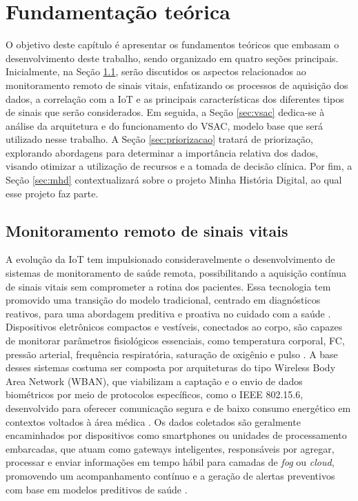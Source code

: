 \documentclass[twoside,english,brazilian]{UNISINOSmonografia}
\begin{document}
\chapter{Fundamentação teórica}

O objetivo deste capítulo é apresentar os fundamentos teóricos que embasam o desenvolvimento deste trabalho, sendo organizado em quatro seções principais. Inicialmente, na Seção \ref{sec:monit}, serão discutidos os aspectos relacionados ao monitoramento remoto de sinais vitais, enfatizando os processos de aquisição dos dados, a correlação com a IoT e as principais características dos diferentes tipos de sinais que serão considerados. Em seguida, a Seção \ref{sec:vsac} dedica-se à análise da arquitetura e do funcionamento do VSAC, modelo base que será utilizado nesse trabalho. A Seção \ref{sec:priorizacao} tratará de priorização, explorando abordagens para determinar a importância relativa dos dados, visando otimizar a utilização de recursos e a tomada de decisão clínica. Por fim, a Seção \ref{sec:mhd} contextualizará sobre o projeto Minha História Digital, ao qual esse projeto faz parte.

\section{Monitoramento remoto de sinais vitais}
\label{sec:monit}

A evolução da IoT tem impulsionado consideravelmente o desenvolvimento de sistemas de monitoramento de saúde remota, possibilitando a aquisição contínua de sinais vitais sem comprometer a rotina dos pacientes.  Essa tecnologia tem promovido uma transição do modelo tradicional, centrado em diagnósticos reativos, para uma abordagem preditiva e proativa no cuidado com a saúde \cite{PARIHAR2024}. Dispositivos eletrônicos compactos e vestíveis, conectados ao corpo, são capazes de monitorar parâmetros fisiológicos essenciais, como temperatura corporal, FC, pressão arterial, frequência respiratória, saturação de oxigênio e pulso \cite{SAHU2022}. A base desses sistemas costuma ser composta por arquiteturas do tipo Wireless Body Area Network (WBAN), que viabilizam a captação e o envio de dados biométricos por meio de protocolos específicos, como o IEEE 802.15.6, desenvolvido para oferecer comunicação segura e de baixo consumo energético em contextos voltados à área médica \cite{KWAK2010}. Os dados coletados são geralmente encaminhados por dispositivos como smartphones ou unidades de processamento embarcadas, que atuam como gateways inteligentes, responsáveis por agregar, processar e enviar informações em tempo hábil para camadas de \textit{fog} ou \textit{cloud}, promovendo um acompanhamento contínuo e a geração de alertas preventivos com base em modelos preditivos de saúde \cite{LI2024}.
\end{document}
